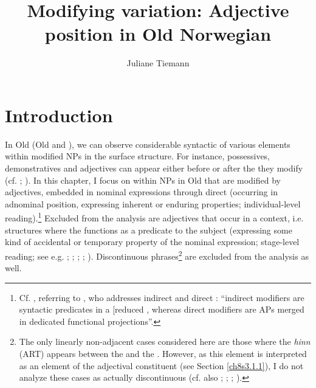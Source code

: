 \documentclass[output=paper,colorlinks,citecolor=brown]{langscibook}
\author{Juliane Tiemann\orcid{}\affiliation{University of Bergen}}
\title{Modifying variation: Adjective position in Old Norwegian}
\begin{document}
\maketitle

\section{Introduction} \label{ch8s1}
In Old  (Old  and ), we can observe
considerable syntactic  of various elements within modified NPs
in the surface structure. 
For instance, possessives, demonstratives and adjectives can appear either before or after the  they modify (cf. \citealp[55]{Faarlund04}; \citealp[e12]{Borjarsetal16}). In this chapter, I focus on
 within NPs in Old  that are modified by 
adjectives, embedded in nominal expressions through direct
 (occurring in adnominal position, expressing inherent
or enduring properties; individual-level reading).\footnote{Cf. \citet[17]{Pfaff2015}, referring to \citet{Cinque2010}, 
  who addresses indirect and direct : ``indirect
  modifiers are syntactic predicates in a {[}reduced \isi{relative clause}{]},
  whereas direct modifiers are APs merged in dedicated functional
  projections''.} Excluded from the 
analysis are adjectives that occur in a  context, i.e.
structures where the  functions as a predicate to the subject
(expressing some kind of accidental or temporary property of the nominal
expression; stage-level reading; see e.g. \citealp[192ff]{SadlerArnold1994}; \citealp[94f]{Cinque1994}; \citealp[6ff]{Cinque2010}; \citealp[274f]{LarsonMarušič2004}; \citealp[7ff]{LarsonTakahashi2004}). Discontinuous
phrases\footnote{The only linearly non-adjacent cases considered here
  are those where the   \emph{hinn} (ART) appears
  between the  and the . However, as this element is
  interpreted as an element of the adjectival constituent (see Section \ref{ch8s3.1.1}), I do not analyze these cases as actually discontinuous (cf.
  also \citealp{Skrzypek2009,Skrzypek2010}; \citealp{StrohWollin2009,StrohWollin2015}; \citealp{Borjarsetal16}; \citealp{Pfaff2019}).} are excluded from the analysis as well.\largerpage[2]
\end{document}
